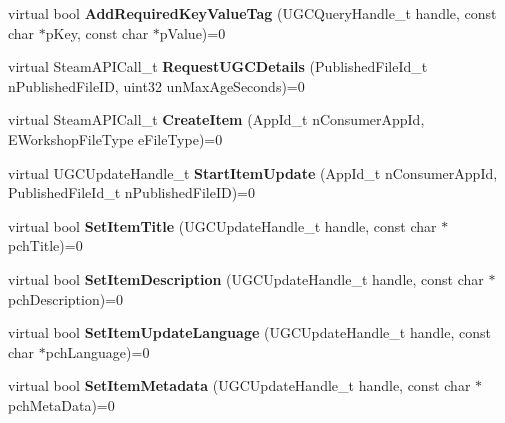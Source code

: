 \begin{DoxyCompactItemize}
\item 
\hypertarget{classISteamUGC_a098d945a167df04b1d718022931da4ab}{}virtual bool {\bfseries Add\+Required\+Key\+Value\+Tag} (U\+G\+C\+Query\+Handle\+\_\+t handle, const char $\ast$p\+Key, const char $\ast$p\+Value)=0\label{classISteamUGC_a098d945a167df04b1d718022931da4ab}

\item 
\hypertarget{classISteamUGC_a698c7277cc2467648d014843de80ccd3}{}virtual Steam\+A\+P\+I\+Call\+\_\+t {\bfseries Request\+U\+G\+C\+Details} (Published\+File\+Id\+\_\+t n\+Published\+File\+I\+D, uint32 un\+Max\+Age\+Seconds)=0\label{classISteamUGC_a698c7277cc2467648d014843de80ccd3}

\item 
\hypertarget{classISteamUGC_a501c538bdc46dc9a4c3ce164b4ddba1a}{}virtual Steam\+A\+P\+I\+Call\+\_\+t {\bfseries Create\+Item} (App\+Id\+\_\+t n\+Consumer\+App\+Id, E\+Workshop\+File\+Type e\+File\+Type)=0\label{classISteamUGC_a501c538bdc46dc9a4c3ce164b4ddba1a}

\item 
\hypertarget{classISteamUGC_af7efa15bc718952a9074331781bebbf4}{}virtual U\+G\+C\+Update\+Handle\+\_\+t {\bfseries Start\+Item\+Update} (App\+Id\+\_\+t n\+Consumer\+App\+Id, Published\+File\+Id\+\_\+t n\+Published\+File\+I\+D)=0\label{classISteamUGC_af7efa15bc718952a9074331781bebbf4}

\item 
\hypertarget{classISteamUGC_ac20d93253d30f8e637d9fa822ce16a01}{}virtual bool {\bfseries Set\+Item\+Title} (U\+G\+C\+Update\+Handle\+\_\+t handle, const char $\ast$pch\+Title)=0\label{classISteamUGC_ac20d93253d30f8e637d9fa822ce16a01}

\item 
\hypertarget{classISteamUGC_a840f9a6a2406dee5e845629f15f21d90}{}virtual bool {\bfseries Set\+Item\+Description} (U\+G\+C\+Update\+Handle\+\_\+t handle, const char $\ast$pch\+Description)=0\label{classISteamUGC_a840f9a6a2406dee5e845629f15f21d90}

\item 
\hypertarget{classISteamUGC_ab0b8ecba7aa766f44fd613eb23b40a01}{}virtual bool {\bfseries Set\+Item\+Update\+Language} (U\+G\+C\+Update\+Handle\+\_\+t handle, const char $\ast$pch\+Language)=0\label{classISteamUGC_ab0b8ecba7aa766f44fd613eb23b40a01}

\item 
\hypertarget{classISteamUGC_ae82eb81e46d10ee16600eb013af3d55c}{}virtual bool {\bfseries Set\+Item\+Metadata} (U\+G\+C\+Update\+Handle\+\_\+t handle, const char $\ast$pch\+Meta\+Data)=0\label{classISteamUGC_ae82eb81e46d10ee16600eb013af3d55c}


\end{DoxyCompactItemize}

